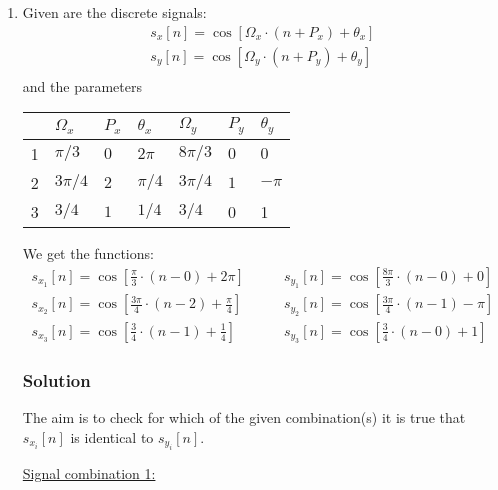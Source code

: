 \begin{enumerate}
	\item Given are the discrete signals:
	\begin{align*}
		s_x[n] = \cos[\Omega_x\cdot(n+P_x)+\theta_x] \\
		s_y[n] = \cos[\Omega_y\cdot(n+P_y)+\theta_y] \\
	\end{align*}
	and the parameters	
	\begin{nscenter}
		\begin{tabular}{c|lll|lll}
			& $\Omega_x$ & $P_x$ & $\theta_x$ 
			& $\Omega_y$ & $P_y$ & $\theta_y$ \\
			\hline
			1 & $\pi/{3}$ & $0$ & $2\pi$ 
			& $8\pi/{3}$ & $0$ & $0$ \\
			2 & $3\pi/4$ & $2$ & $\pi/4$
			& $3\pi/4$ & $1$ & $-\pi$ \\
			3 & $3/4$ & $1$ & $1/4$
			& $3/4$ & 0 & 1
		\end{tabular}
	\end{nscenter}
	
	We get the functions:
	{
		\setlength{\abovedisplayskip}{0pt}
		\setlength{\belowdisplayskip}{6pt}
		\setlength{\abovedisplayshortskip}{0pt}
		\setlength{\belowdisplayshortskip}{0pt}
		\begin{align*}
			s_{x_1}[n] = \cos\left[\frac{\pi}{3}\cdot\left(n-0\right)+2\pi\right] & \qquad 
			s_{y_1}[n] = \cos\left[\frac{8\pi}{3}\cdot\left(n-0\right)+0\right] \\
			s_{x_2}[n] = \cos\left[\frac{3\pi}{4}\cdot\left(n-2\right)+\frac{\pi}{4}\right] & \qquad 
			s_{y_2}[n] = \cos\left[\frac{3\pi}{4}\cdot\left(n-1\right)-\pi\right] \\
			s_{x_3}[n] = \cos\left[\frac{3}{4}\cdot\left(n-1\right)+\frac{1}{4}\right] & \qquad 
			s_{y_3}[n] = \cos\left[\frac{3}{4}\cdot\left(n-0\right)+1\right]
		\end{align*}
	}
	\subsubsection{Solution}
	The aim is to check for which of the given combination(s) it is true that $s_{x_i}[n]$ is identical to $s_{y_i}[n]$.
	
	{
		\setlength{\abovedisplayskip}{0pt}
		\setlength{\belowdisplayskip}{6pt}
		\setlength{\abovedisplayshortskip}{0pt}
		\setlength{\belowdisplayshortskip}{0pt}
		
		\underline{Signal combination 1:}
		
}
\end{enumerate}
